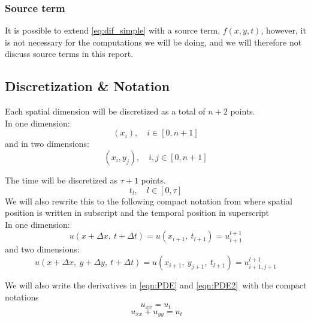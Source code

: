 \documentclass[10pt,a4paper]{article}
\newcommand{\dt}{{\Delta t}}
\newcommand{\dx}{{\Delta x}}
\newcommand{\dy}{{\Delta y}}
\begin{document}
\subsubsection{Source term}
It is possible to extend \vref{eq:dif_simple} with a source term, $f(x, y, t)$, however, it is not necessary for the computations we will be doing, and we will therefore not discuss source terms in this report.



\subsection{Discretization \& Notation}\label{sec:disc}
Each spatial dimension will be discretized as a total of $n+2$ points.\\
In one dimension:
\begin{equation} (x_i), \quad i \in [0,n+1] \end{equation}
and in two dimensions:
\begin{equation} (x_i, y_j), \quad i,j \in [0,n+1]\end{equation}

The time will be discretized as $\tau+1$ points.
\begin{equation} t_l, \quad l \in [0,\tau] \end{equation}
We will also rewrite this to the following compact notation from \cite{hpl_fdm} where spatial position is written in subscript and the temporal position in superscript \\
In one dimension:
\begin{equation}
u(x+\dx,\ t+\dt) = u(x_{i+1},\ t_{l+1}) = u_{i+1}^{l+1}
\end{equation}
and two dimensions:
\begin{equation}
u(x+\dx,\ y+\dy,\ t+\dt) = u(x_{i+1},\ y_{j+1},\ t_{l+1}) = u_{i+1,j+1}^{l+1}
\end{equation}


We will also write the derivatives in \ref{eqn:PDE} and \ref{eqn:PDE2} with the compact notations
\begin{equation} u_{xx} = u_t\end{equation}
\begin{equation} \ u_{xx} + u_{yy} = u_t \end{equation}
\end{document}

